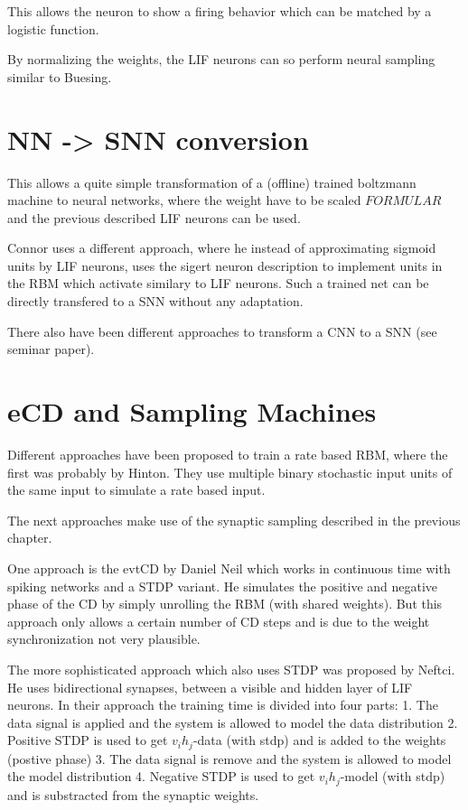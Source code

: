 This allows the neuron to show a firing behavior which can be matched by a logistic function.  

By normalizing the weights, the LIF neurons can so perform neural sampling similar to Buesing.


\section{NN -> SNN conversion}

This allows a quite simple transformation of a (offline) trained boltzmann machine to neural networks, where the weight have to be scaled $FORMULAR$ and the previous described LIF neurons can be used.

Connor uses a different approach, where he instead of approximating sigmoid units by LIF neurons, uses the sigert neuron description to implement units in the RBM which activate similary to LIF neurons. 
Such a trained net can be directly transfered to a SNN without any adaptation.

There also have been different approaches to transform a CNN to a SNN (see seminar paper).  


\section{eCD and Sampling Machines}

Different approaches have been proposed to train a rate based RBM, where the first was probably by Hinton.
They use multiple binary stochastic input units of the same input to simulate a rate based input.

The next approaches make use of the synaptic sampling described in the previous chapter.

One approach is the evtCD by Daniel Neil which works in continuous time with spiking networks and a STDP variant.
He simulates the positive and negative phase of the CD by simply unrolling the RBM (with shared weights). 
But this approach only allows a certain number of CD steps and is due to the weight synchronization not very plausible.

The more sophisticated approach which also uses STDP was proposed by Neftci.
He uses bidirectional synapses, between a visible and hidden layer of LIF neurons.
In their approach the training time is divided into four parts:
1. The data signal is applied and the system is allowed to model the data distribution
2. Positive STDP is used to get $v_i h_j$-data (with stdp) and is added to the weights (postive phase)
3. The data signal is remove and the system is allowed to model the model distribution
4. Negative STDP is used to get $v_i h_j$-model (with stdp) and is substracted from the synaptic weights.

